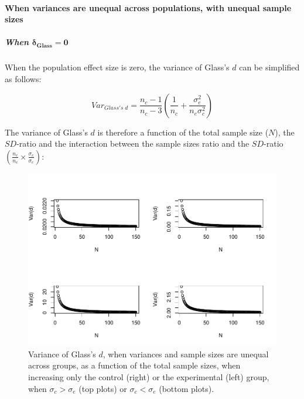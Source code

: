 \documentclass[
  english,
  man,mask]{apa6}
\let\oldparagraph\paragraph
\renewcommand{\paragraph}[1]{\oldparagraph{#1}\mbox{}}
\let\oldsubparagraph\subparagraph
\renewcommand{\subparagraph}[1]{\oldsubparagraph{#1}\mbox{}}
\begin{document}
\hypertarget{when-variances-are-unequal-across-populations-with-unequal-sample-sizes-2}{%
\paragraph{When variances are unequal across populations, with unequal sample sizes}\label{when-variances-are-unequal-across-populations-with-unequal-sample-sizes-2}}

\hypertarget{when-bmdelta_glass-0-1}{%
\subparagraph{\texorpdfstring{When \(\bm{\delta_{Glass} = 0}\)}{When \textbackslash bm\{\textbackslash delta\_\{Glass\} = 0\}}}\label{when-bmdelta_glass-0-1}}

When the population effect size is zero, the variance of Glass's \(d\) can be simplified as follows:

\[Var_{Glass's \; d} = \frac{n_c-1}{n_c-3} \left( \frac{1}{n_c}+\frac{\sigma^2_e}{n_e\sigma^2_c}\right)\]

The variance of Glass's \(d\) is therefore a function of the total sample size (\(N\)), the \(SD\)-ratio and the interaction between the sample sizes ratio and the \(SD\)-ratio \(\left(\frac{n_c}{n_e}\times\frac{\sigma_c}{\sigma_e} \right)\):

\begin{figure}
\centering
\includegraphics{Theoretical-Bias-of-all-estimators-as-a-function-of-population-parameters_files/figure-latex/varglassHetunbalNsize2-1.pdf}
\caption{\label{fig:varglassHetunbalNsize2}Variance of Glass's \(d\), when variances and sample sizes are unequal across groups, as a function of the total sample sizes, when increasing only the control (right) or the experimental (left) group, when \(\sigma_c > \sigma_e\) (top plots) or \(\sigma_c < \sigma_e\) (bottom plots).}
\end{figure}
\end{document}
